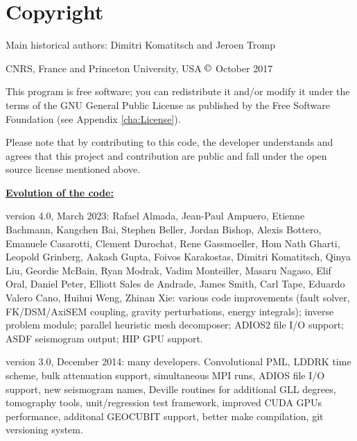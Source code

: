 
\chapter*{Copyright}

Main historical authors: Dimitri Komatitsch and Jeroen Tromp

CNRS, France and Princeton University, USA\newline
$\copyright$ October 2017\newline

\noindent
This program is free software; you can redistribute it and/or modify
it under the terms of the GNU General Public License as published
by the Free Software Foundation (see Appendix \ref{cha:License}).\newline

\noindent
Please note that by contributing to this code, the developer understands and agrees that this project and contribution
are public and fall under the open source license mentioned above.\newline

\noindent
\textbf{\underline{Evolution of the code:}}\newline

version 4.0, March 2023:
Rafael Almada, Jean-Paul Ampuero, Etienne Bachmann, Kangchen Bai, Stephen Beller, Jordan Bishop, Alexis Bottero,
Emanuele Casarotti, Clement Durochat, Rene Gassmoeller, Hom Nath Gharti, Leopold Grinberg, Aakash Gupta,
Foivos Karakostas, Dimitri Komatitsch, Qinya Liu, Geordie McBain, Ryan Modrak, Vadim Monteiller, Masaru Nagaso, Elif Oral,
Daniel Peter, Elliott Sales de Andrade,  James Smith, Carl Tape, Eduardo Valero Cano, Huihui Weng, Zhinan Xie:
various code improvements (fault solver, FK/DSM/AxiSEM coupling, gravity perturbations, energy integrals);
inverse problem module; parallel heuristic mesh decomposer; ADIOS2 file I/O support;
ASDF seismogram output; HIP GPU support.\newline


version 3.0, December 2014: many developers.
Convolutional PML, LDDRK time scheme, bulk attenuation support, simultaneous MPI runs,
ADIOS file I/O support, new seismogram names,
Deville routines for additional GLL degrees, tomography tools, unit/regression test framework,
improved CUDA GPUs performance, additonal GEOCUBIT support, better make compilation,
git versioning system. \newline


